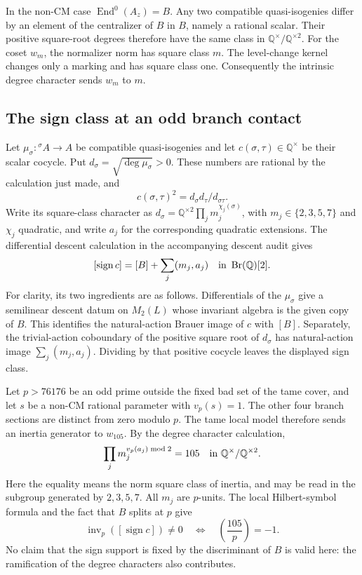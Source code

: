 In the non-CM case $\operatorname{End}^0(A_z)=B$. Any two compatible
quasi-isogenies differ by an element of the centralizer of $B$ in $B$,
namely a rational scalar. Their positive square-root degrees therefore
have the same class in $\mathbb Q^\times/\mathbb Q^{\times2}$.
For the coset $w_m$, the normalizer norm has square class $m$. The
level-change kernel changes only a marking and has square class one.
Consequently the intrinsic degree character sends $w_m$ to $m$.

\subsection{The sign class at an odd branch contact}
Let $\mu_\sigma:{}^\sigma A\to A$ be compatible quasi-isogenies and
let $c(\sigma,\tau)\in\mathbb Q^\times$ be their scalar cocycle.
Put $d_\sigma=\sqrt{\deg\mu_\sigma}>0$. These numbers are rational
by the calculation just made, and
\[
 c(\sigma,\tau)^2=d_\sigma d_\tau/d_{\sigma\tau}.
\]
Write its square-class character as
$d_\sigma=\mathbb Q^{\times2}\prod_jm_j^{\chi_j(\sigma)}$, with
$m_j\in\{2,3,5,7\}$ and $\chi_j$ quadratic, and write $a_j$ for
the corresponding quadratic extensions. The differential descent
calculation in the accompanying descent audit gives
\[
 [\operatorname{sign}c]=[B]+\sum_j(m_j,a_j)\quad\hbox{in }\operatorname{Br}(\mathbb Q)[2].
\]
For clarity, its two ingredients are as follows. Differentials of the
$\mu_\sigma$ give a semilinear descent datum on $M_2(L)$ whose invariant
algebra is the given copy of $B$. This identifies the natural-action
Brauer image of $c$ with $[B]$. Separately, the trivial-action coboundary
of the positive square root of $d_\sigma$ has natural-action image
$\sum_j(m_j,a_j)$. Dividing by that positive cocycle leaves the displayed
sign class.

Let $p>76176$ be an odd prime outside the fixed bad set of the tame cover,
and let $s$ be a non-CM rational parameter
with $v_p(s)=1$. The other four branch sections are distinct from zero
modulo $p$. The tame local model therefore sends an inertia generator
to $w_{105}$. By the degree character calculation,
\[
 \prod_jm_j^{v_p(a_j)\bmod2}=105
 \quad\hbox{in }\mathbb Q^\times/\mathbb Q^{\times2}.
\]
Here the equality means the norm square class of inertia, and may be
read in the subgroup generated by $2,3,5,7$. All $m_j$ are $p$-units.
The local Hilbert-symbol formula and the fact that $B$ splits at $p$
give
\[
 \operatorname{inv}_p([\operatorname{sign}c])\ne0
 \quad\Longleftrightarrow\quad \left(\frac{105}{p}\right)=-1.
\]
No claim that the sign support is fixed by the discriminant of $B$ is
valid here: the ramification of the degree characters also contributes.


